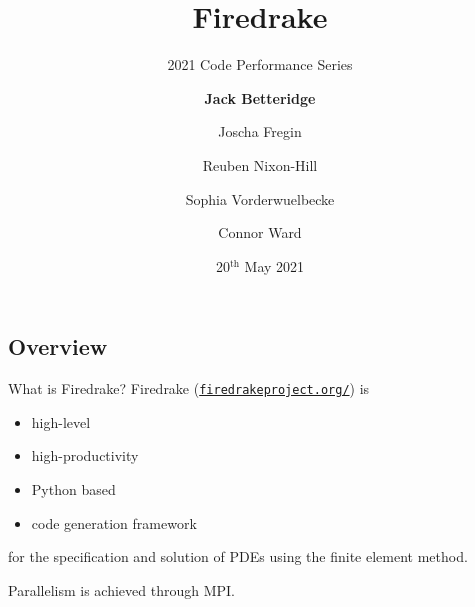 \documentclass[pdf,aspectratio=169]{beamer}
\title[Firedrake]{Firedrake}
\subtitle{2021 Code Performance Series}
\author[JB,JF,RNH,SV,CW]{\textbf{Jack Betteridge} \and Joscha Fregin \and Reuben Nixon-Hill \and Sophia Vorderwuelbecke \and Connor Ward}
\date[20/5/2021]{20${}^\text{th}$ May 2021}
\begin{document}
\maketitle

\subsection{Overview}
\begin{frame}{What is Firedrake?}
Firedrake (\href{http://firedrakeproject.org/}{\texttt{firedrakeproject.org/}}) is
\begin{itemize}
	\item high-level
	\item high-productivity
	\item Python based
	\item code generation framework
\end{itemize}
for the specification and solution of PDEs using the finite element method. 

Parallelism is achieved through MPI.
\end{frame}

\end{document}

